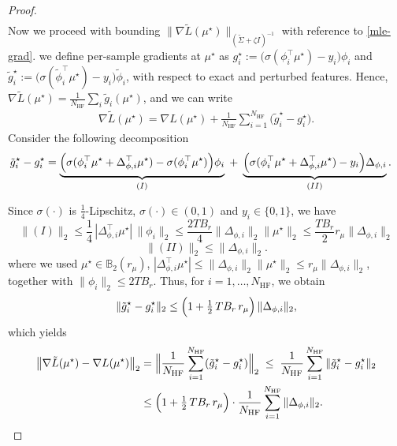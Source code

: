 \documentclass[10pt]{article} %
\theoremstyle{plain}
\theoremstyle{definition}
\theoremstyle{remark}
\newcommand{\bB}{\mathbb{B}}
\begin{document}
\begin{proof}
\begin{align}
\end{align}
Now we proceed with bounding $\|\nabla\tilde L(\mu^\star)\|_{(\tilde\Sigma+\zeta I)^{-1}}$ with reference to \ref{mle-grad}. we define per-sample gradients at $\mu^\star$ as \(g_i^\star
:= \bigl(\sigma(\phi_i^\top\mu^\star)-y_i\bigr)\phi_i\) and \(\tilde g_i^\star
:= \bigl(\sigma(\tilde\phi_i^\top\mu^\star)-y_i\bigr)\tilde\phi_i\), with respect to exact and perturbed features. Hence, $\nabla\tilde L(\mu^\star)=\frac{1}{N_{\mathrm{HF}}}\sum_i\tilde g_i(\mu^\star)$, and we can write
\begin{align}\label{eq:likelihood-grad-decomp}
\nabla\tilde L(\mu^\star)
=\nabla L(\mu^\star)+\frac{1}{N_{\mathrm{HF}}}\sum_{i=1}^{N_{\mathrm{HF}}}\bigl(\tilde g_i^\star-g_i^\star\bigr).
\end{align}
Consider the following decomposition
\begin{align*}
\tilde g_i^\star-g_i^\star
&=\underbrace{\Bigl(\sigma(\phi_i^\top\mu^\star+\Delta_{\phi,i}^\top\mu^\star)-\sigma(\phi_i^\top\mu^\star)\Bigr)\phi_i}_{(I)}\;+\;\underbrace{\Bigl(\sigma(\phi_i^\top\mu^\star+\Delta_{\phi,i}^\top\mu^\star)-y_i\Bigr)\Delta_{\phi,i}}_{(II)}.
\end{align*}
 



Since \(\sigma(\cdot)\) is \(\tfrac14\)-Lipschitz, \(\sigma(\cdot)\in(0,1)\) and \(y_i\in\{0,1\}\), we have
\[
\|(I)\|_2\le\frac14\,|\Delta_{\phi,i}^\top\mu^\star|\,\|\phi_i\|_2\le\frac{2T B_r}{4}\|\Delta_{\phi,i}\|_2\|\mu^\star\|_2\le \frac{T B_r}{2}r_\mu\|\Delta_{\phi,i}\|_2
\]
\[\|(II)\|_2\le\|\Delta_{\phi,i}\|_2.
\]
where we used  \(\mu^\star\in\bB_2(r_\mu)\), \(|\Delta_{\phi,i}^\top\mu^\star|\le \|\Delta_{\phi,i}\|_2\|\mu^\star\|_2\le r_\mu\|\Delta_{\phi,i}\|_2\),
together with \(\|\phi_i\|_2\le 2T B_r\). Thus, for $i=1,\dots,N_{\mathrm{HF}}$, we obtain
\begin{equation}\label{eq:gi-perturb-bound}
\|\tilde g_i^\star-g_i^\star\|_2 \le \Bigl(1+\tfrac12\,T B_r\,r_\mu\Bigr)\,\|\Delta_{\phi,i}\|_2,
\end{equation}
which yields
\begin{align}
\bigl\|\nabla\tilde L(\mu^\star)-\nabla L(\mu^\star)\bigr\|_2
&=\Bigl\|\frac{1}{N_{\mathrm{HF}}}\sum_{i=1}^{N_{\mathrm{HF}}}(\tilde g_i^\star-g_i^\star)\Bigr\|_2 \;\le\; \frac{1}{N_{\mathrm{HF}}}\sum_{i=1}^{N_{\mathrm{HF}}}\|\tilde g_i^\star-g_i^\star\|_2 \notag\\
&\le \Bigl(1+\tfrac12\,T B_r\,r_\mu\Bigr)\cdot \frac{1}{N_{\mathrm{HF}}}\sum_{i=1}^{N_{\mathrm{HF}}}\|\Delta_{\phi,i}\|_2. \label{eq:score-shift-euclid}
\end{align}


\end{proof}
\end{document}
